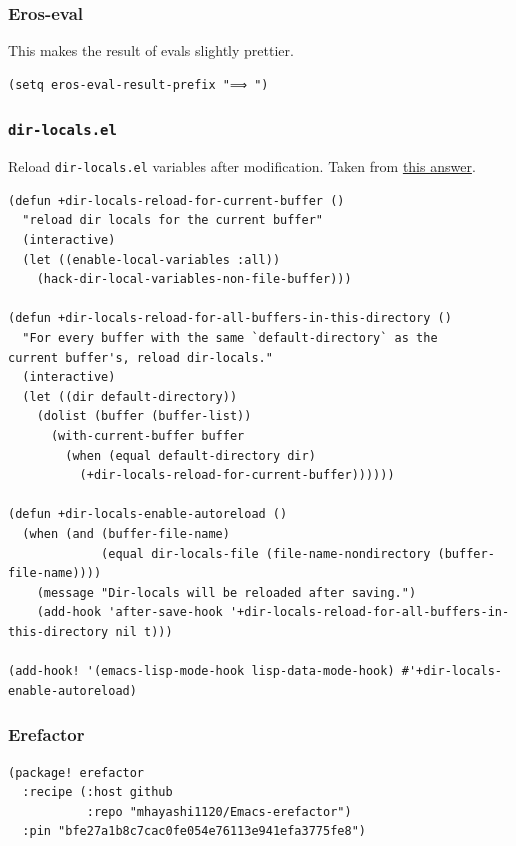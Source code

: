 \documentclass[11pt]{article}
\begin{document}
\subsubsection{Eros-eval}
\label{sec:org203135d}
This makes the result of evals slightly prettier.

\begin{verbatim}
(setq eros-eval-result-prefix "⟹ ")
\end{verbatim}

\subsubsection{\texttt{dir-locals.el}}
\label{sec:org9833908}
Reload \texttt{dir-locals.el} variables after modification. Taken from \href{https://emacs.stackexchange.com/a/13096}{this answer}.

\begin{verbatim}
(defun +dir-locals-reload-for-current-buffer ()
  "reload dir locals for the current buffer"
  (interactive)
  (let ((enable-local-variables :all))
    (hack-dir-local-variables-non-file-buffer)))

(defun +dir-locals-reload-for-all-buffers-in-this-directory ()
  "For every buffer with the same `default-directory` as the
current buffer's, reload dir-locals."
  (interactive)
  (let ((dir default-directory))
    (dolist (buffer (buffer-list))
      (with-current-buffer buffer
        (when (equal default-directory dir)
          (+dir-locals-reload-for-current-buffer))))))

(defun +dir-locals-enable-autoreload ()
  (when (and (buffer-file-name)
             (equal dir-locals-file (file-name-nondirectory (buffer-file-name))))
    (message "Dir-locals will be reloaded after saving.")
    (add-hook 'after-save-hook '+dir-locals-reload-for-all-buffers-in-this-directory nil t)))

(add-hook! '(emacs-lisp-mode-hook lisp-data-mode-hook) #'+dir-locals-enable-autoreload)
\end{verbatim}

\subsubsection{Erefactor}
\label{sec:org22e53d7}

\begin{verbatim}
(package! erefactor
  :recipe (:host github
           :repo "mhayashi1120/Emacs-erefactor")
  :pin "bfe27a1b8c7cac0fe054e76113e941efa3775fe8")
\end{verbatim}
\end{document}
